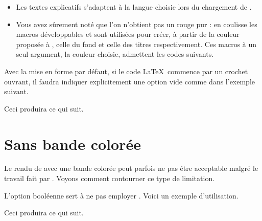 \begin{bdocinfo}
    \leavevmode

    \begin{itemize}
    	\item Les textes explicatifs s'adaptent à la langue choisie lors du chargement de .

    	\item Vous avez sûrement noté que l'on n'obtient pas un rouge pur : en coulisse les macros développables  et  sont utilisées pour créer, à partir de la couleur proposée à , celle du fond et celle des titres respectivement.
	          Ces macros à un seul argument, la couleur choisie, admettent les codes suivants.

		      \begin{bdoclatex}[code]

		      \end{bdoclatex}
    \end{itemize}
\end{bdocinfo}




\begin{bdocwarning}
    Avec la mise en forme par défaut, si le code \LaTeX\ commence par un crochet ouvrant, il faudra indiquer explicitement une option vide comme dans l'exemple suivant.


	Ceci produira ce qui suit.

	\medskip

	
\end{bdocwarning}




\section{Sans bande colorée}

Le rendu de  avec une bande colorée peut parfois ne pas être acceptable malgré le travail fait par .
Voyons comment contourner ce type de limitation.

\begin{bdocexa}
	L'option booléenne  sert à ne pas employer .
	Voici un exemple d'utilisation.


	Ceci produira ce qui suit.

	\medskip

	
\end{bdocexa}


